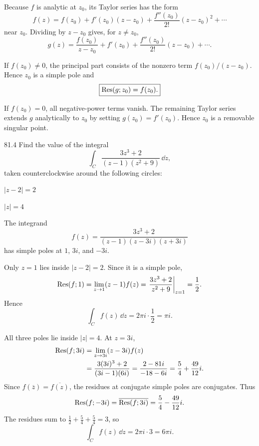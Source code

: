 \documentclass[11pt,oneside]{article}
\begin{document}
\begin{solution}
Because $f$ is analytic at $z_0$, its Taylor series has the form
\[
    f(z)=f(z_0)+f'(z_0)(z-z_0)
        +\frac{f''(z_0)}{2!}(z-z_0)^2+\cdots
\]
near $z_0$. Dividing by $z-z_0$ gives, for $z\ne z_0$,
\[
    g(z)=\frac{f(z_0)}{z-z_0}+f'(z_0)
       +\frac{f''(z_0)}{2!}(z-z_0)+\cdots.
\]
\begin{exercisesubparts}
    \item If $f(z_0)\ne0$, the principal part consists of the nonzero term $f(z_0)/(z-z_0)$. Hence $z_0$ is a simple pole and
    \[
        \boxed{\operatorname{Res}(g; z_0)=f(z_0).}
    \]

    \item If $f(z_0)=0$, all negative-power terms vanish. The remaining Taylor series extends $g$ analytically to $z_0$ by setting $g(z_0)=f'(z_0)$. Hence $z_0$ is a removable singular point.
\end{exercisesubparts}
\end{solution}

\begin{exercise}{81.4}
Find the value of the integral
\[
    \int_C\frac{3z^3+2}{(z-1)(z^2+9)}\,\dd z,
\]
taken counterclockwise around the following circles:
\begin{exercisesubparts}
    \item $|z-2|=2$
    \item $|z|=4$
\end{exercisesubparts}
\end{exercise}

\begin{solution}
The integrand
\[
    f(z)=\frac{3z^3+2}{(z-1)(z-3i)(z+3i)}
\]
has simple poles at $1$, $3i$, and $-3i$.
\begin{exercisesubparts}
    \item Only $z=1$ lies inside $|z-2|=2$. Since it is a simple pole,
    \[
        \operatorname{Res}(f; 1)=\displaystyle\lim_{z\to1}(z-1)f(z)
        =\left.\frac{3z^3+2}{z^2+9}\right|_{z=1}=\frac12.
    \]
    Hence
    \[
        \boxed{\int_C f(z)\,\dd z=2\pi i\cdot\frac12=\pi i.}
    \]

    \item All three poles lie inside $|z|=4$. At $z=3i$,
    \[
    \begin{aligned}
        \operatorname{Res}(f; 3i)
        &=\displaystyle\lim_{z\to3i}(z-3i)f(z)\\
        &=\frac{3(3i)^3+2}{(3i-1)(6i)}
         =\frac{2-81i}{-18-6i}
         =\frac54+\frac{49}{12}i.
    \end{aligned}
    \]
    Since $f(\overline{z})=\overline{f(z)}$, the residues at conjugate simple poles are conjugates. Thus
    \[
        \operatorname{Res}(f; -3i)=\overline{\operatorname{Res}(f; 3i)}
        =\frac54-\frac{49}{12}i.
    \]
    The residues sum to $\frac12+\frac54+\frac54=3$, so
    \[
        \boxed{\int_C f(z)\,\dd z=2\pi i\cdot3=6\pi i.}
    \]
\end{exercisesubparts}
\end{solution}
\end{document}
